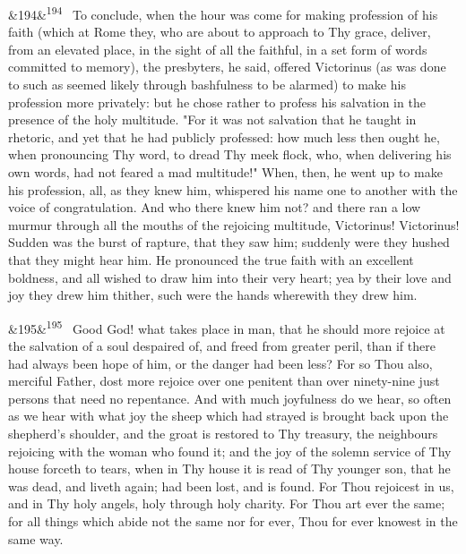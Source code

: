 \documentclass[12pt]{article}
\newcommand{\para}[1][]{\par\noindent\ifx&#1&\else\textsuperscript{\footnotesize #1}~\fi}
\begin{document}
\para[194] To conclude, when the hour was come for making profession of his faith (which at Rome they, who are about to approach to Thy grace, deliver, from an elevated place, in the sight of all the faithful, in a set form of words committed to memory), the presbyters, he said, offered Victorinus (as was done to such as seemed likely through bashfulness to be alarmed) to make his profession more privately: but he chose rather to profess his salvation in the presence of the holy multitude. "For it was not salvation that he taught in rhetoric, and yet that he had publicly professed: how much less then ought he, when pronouncing Thy word, to dread Thy meek flock, who, when delivering his own words, had not feared a mad multitude!" When, then, he went up to make his profession, all, as they knew him, whispered his name one to another with the voice of congratulation. And who there knew him not? and there ran a low murmur through all the mouths of the rejoicing multitude, Victorinus! Victorinus! Sudden was the burst of rapture, that they saw him; suddenly were they hushed that they might hear him. He pronounced the true faith with an excellent boldness, and all wished to draw him into their very heart; yea by their love and joy they drew him thither, such were the hands wherewith they drew him.

\para[195] Good God! what takes place in man, that he should more rejoice at the salvation of a soul despaired of, and freed from greater peril, than if there had always been hope of him, or the danger had been less? For so Thou also, merciful Father, dost more rejoice over one penitent than over ninety-nine just persons that need no repentance. And with much joyfulness do we hear, so often as we hear with what joy the sheep which had strayed is brought back upon the shepherd's shoulder, and the groat is restored to Thy treasury, the neighbours rejoicing with the woman who found it; and the joy of the solemn service of Thy house forceth to tears, when in Thy house it is read of Thy younger son, that he was dead, and liveth again; had been lost, and is found. For Thou rejoicest in us, and in Thy holy angels, holy through holy charity. For Thou art ever the same; for all things which abide not the same nor for ever, Thou for ever knowest in the same way.
\end{document}
